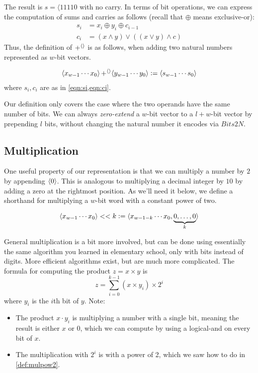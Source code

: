 The result is $s=\langle{11110}$ with no carry.  In terms of bit
operations, we can express the computation of sums and carries as
follows (recall that $\oplus$ means exclusive-or):
\begin{align}
  s_{i} &= x_{i} \oplus y_{i} \oplus c_{i-1} \label{eqn:si} \\
  c_{i} &= (x\land{}y)\lor{}((x\lor{}y)\land{}c) \label{eqn:ci}
\end{align}
Thus, the definition of $\operatorname{+^{\langle\rangle}}$ is as follows, when adding two
natural numbers represented as $w$-bit vectors.
\begin{definition}
\begin{align*}
  \langle x_{w-1}\cdots{}x_{0} \rangle \operatorname{+^{\langle\rangle}} \langle y_{w-1}\cdots{}y_{0} \rangle \vcentcolon=
  \langle s_{w-1}\cdots{}s_{0} \rangle
\end{align*}
where $s_{i},c_{i}$ are as in \cref{eqn:si,eqn:ci}.
\end{definition}

Our definition only covers the case where the two operands have the
same number of bits.  We can always \emph{zero-extend} a $w$-bit
vector to a $l+w$-bit vector by prepending $l$ bits, without changing
the natural number it encodes via $Bits2N$.

\subsection{Multiplication}
\label{sec:bit-multiplication}

One useful property of our representation is that we can multiply a
number by $2$ by appending $\langle 0 \rangle$.  This is analogous to
multiplying a decimal integer by $10$ by adding a zero at the
rightmost position.  As we'll need it below, we define a shorthand for
multiplying a $w$-bit word with a constant power of two.
\begin{definition}
  \begin{align*}
  \langle x_{w-1}\cdots{}x_{0} \rangle << k \vcentcolon=
  \langle x_{w-1-k}\cdots{}x_{0},\underbrace{0,\ldots,0}_{k} \rangle
  \end{align*}
  \label{def:mulpow2}
\end{definition}

General multiplication is a bit more involved, but can be done using
essentially the same algorithm you learned in elementary school, only
with bits instead of digits.  More efficient algorithms exist, but are
much more complicated.  The formula for computing the product
$z=x\times{}y$ is
\begin{equation}
  z = \sum_{i=0}^{k-1} (x \times y_{i}) \times 2^{i}
\end{equation}
where $y_{i}$ is the $i$th bit of $y$.  Note:
\begin{itemize}
\item The product $x \cdot y_{i}$ is multiplying a number with a
  single bit, meaning the result is either $x$ or $0$, which we can
  compute by using a logical-and on every bit of $x$.
\item The multiplication with $2^{i}$ is with a power of 2, which we
  saw how to do in \cref{def:mulpow2}.
\end{itemize}

